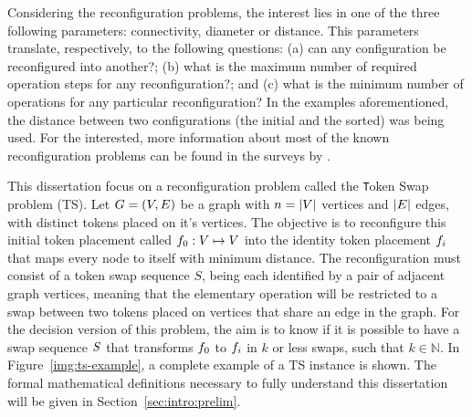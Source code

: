 \documentclass[msc,english,table,xcdraw]{ppgccufmg}
\begin{document}
Considering the reconfiguration problems, the interest lies in one of the three
following parameters: connectivity, diameter or distance.
This parameters translate, respectively, to the following questions: (a) can any
configuration be reconfigured into another?; (b) what is the maximum number of 
required operation steps for any reconfiguration?; and (c) what is the minimum 
number of operations for any particular reconfiguration?
In the examples aforementioned, the distance between two configurations (the 
initial and the sorted) was being used.
For the interested, more information about most of the known reconfiguration 
problems can be found in the surveys by \citep
{Heuvel:2013,Mouawad:2015,Naomi:2018}.


This dissertation focus on a reconfiguration problem called the {\texttt Token
Swap} problem (TS).
Let $G = (V,E)$ be a graph with $n = |V|$ 
vertices and $|E|$ edges, with distinct tokens placed on it's 
vertices. 
The objective is to reconfigure this initial token placement called  
$f_{0} : V \mapsto V$ into the identity token 
placement $f_{i}$ that maps every node to itself with minimum distance. 
The reconfiguration must consist of a token swap sequence $S$, being each 
identified by a pair of adjacent graph vertices, meaning that the elementary
operation will be restricted to a swap between two tokens placed on vertices 
that share an edge in the graph.
For the decision version of this problem, the aim is to know if it is possible 
to have a swap sequence $S$ that transforms $f_{0}$ to $f_{i}$ in $k$ 
or less swaps, such that $k \in \mathbb{N}$.
In Figure~\ref{img:ts-example}, a complete example of a TS instance is shown.
The formal mathematical definitions necessary to fully understand this dissertation 
will be given in Section~\ref{sec:intro:prelim}.

\end{document}
